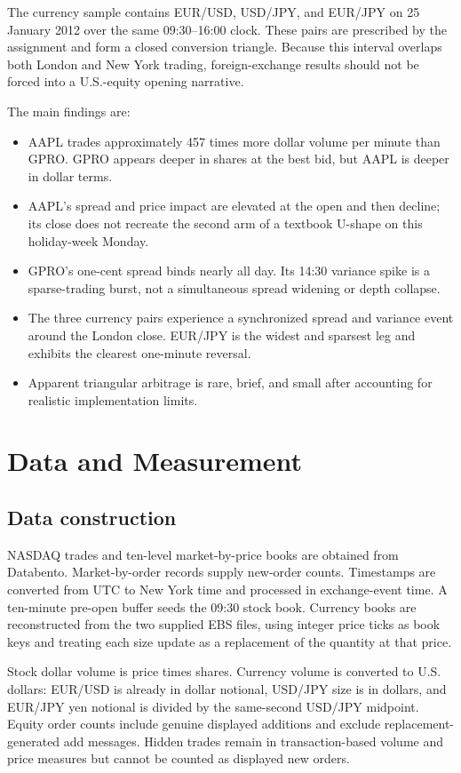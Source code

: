 \documentclass[11pt]{article}
\begin{document}
The currency sample contains EUR/USD, USD/JPY, and EUR/JPY on 25 January 2012 over the same 09:30--16:00 clock. These pairs are prescribed by the assignment and form a closed conversion triangle. Because this interval overlaps both London and New York trading, foreign-exchange results should not be forced into a U.S.-equity opening narrative.

The main findings are:
\begin{itemize}
  \item AAPL trades approximately 457 times more dollar volume per minute than GPRO. GPRO appears deeper in shares at the best bid, but AAPL is deeper in dollar terms.
  \item AAPL's spread and price impact are elevated at the open and then decline; its close does not recreate the second arm of a textbook U-shape on this holiday-week Monday.
  \item GPRO's one-cent spread binds nearly all day. Its 14:30 variance spike is a sparse-trading burst, not a simultaneous spread widening or depth collapse.
  \item The three currency pairs experience a synchronized spread and variance event around the London close. EUR/JPY is the widest and sparsest leg and exhibits the clearest one-minute reversal.
  \item Apparent triangular arbitrage is rare, brief, and small after accounting for realistic implementation limits.
\end{itemize}

\section{Data and Measurement}

\subsection{Data construction}

NASDAQ trades and ten-level market-by-price books are obtained from Databento. Market-by-order records supply new-order counts. Timestamps are converted from UTC to New York time and processed in exchange-event time. A ten-minute pre-open buffer seeds the 09:30 stock book. Currency books are reconstructed from the two supplied EBS files, using integer price ticks as book keys and treating each size update as a replacement of the quantity at that price.

Stock dollar volume is price times shares. Currency volume is converted to U.S. dollars: EUR/USD is already in dollar notional, USD/JPY size is in dollars, and EUR/JPY yen notional is divided by the same-second USD/JPY midpoint. Equity order counts include genuine displayed additions and exclude replacement-generated add messages. Hidden trades remain in transaction-based volume and price measures but cannot be counted as displayed new orders.
\end{document}
